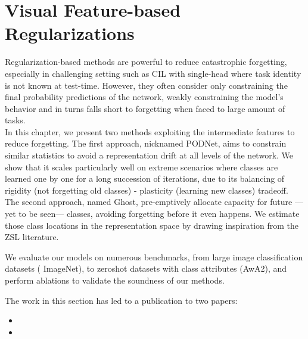 \chapter{Visual Feature-based Regularizations}
\label{chapter:regularization}

\newcommand{\tableindent}{\,\,\,\,}
\newcommand{\vt}{\mathbf{t}}
\newcommand{\std}{$\pm\,$}
\newcommand{\clf}{\textit{clf}} \newcommand{\gray}[1]{{\color{darkgray}#1}}


\begin{chapabstract}
    Regularization-based methods are powerful to reduce catastrophic forgetting, especially in
    challenging setting such as \ac{CIL} with single-head where task identity is not known at
    test-time. However, they often consider only constraining the final probability predictions of
    the network, weakly constraining the model's behavior and in turns falls short to forgetting
    when faced to large amount of tasks. \\
    In this chapter, we present two methods exploiting the intermediate features to reduce
    forgetting. The first approach, nicknamed PODNet, aims to constrain similar statistics to avoid
    a representation drift at all levels of the network. We show that it scales particularly well on
    extreme scenarios where classes are learned one by one for a long succession of iterations, due
    to its balancing of rigidity (not forgetting old classes) - plasticity (learning new classes)
    tradeoff. The second approach, named Ghost, pre-emptively allocate capacity for future ---yet to
    be seen--- classes, avoiding forgetting before it even happens. We estimate those class
    locations in the representation space by drawing inspiration from the \ac{ZSL} literature.

    We evaluate our models on numerous benchmarks, from large image classification datasets (\eg
    ImageNet), to zeroshot datasets with class attributes (\eg AwA2), and perform ablations
    to validate the soundness of our methods.

    The work in this section has led to a publication to two papers:

    \begin{itemize}
        \item {}
        \item {}
    \end{itemize}

\end{chapabstract}
\newpage

